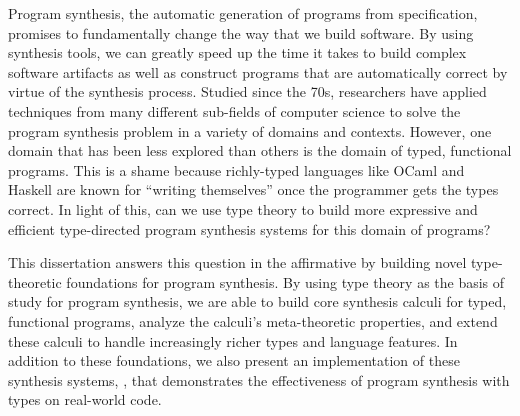 Program synthesis, the automatic generation of programs from specification, promises to fundamentally change the way that we build software.
By using synthesis tools, we can greatly speed up the time it takes to build complex software artifacts as well as construct programs that are automatically correct by virtue of the synthesis process.
Studied since the 70s, researchers have applied techniques from many different sub-fields of computer science to solve the program synthesis problem in a variety of domains and contexts.
However, one domain that has been less explored than others is the domain of typed, functional programs.
This is a shame because richly-typed languages like OCaml and Haskell are known for ``writing themselves'' once the programmer gets the types correct.
In light of this, can we use type theory to build more expressive and efficient type-directed program synthesis systems for this domain of programs?

This dissertation answers this question in the affirmative by building novel type-theoretic foundations for program synthesis.
By using type theory as the basis of study for program synthesis, we are able to build core synthesis calculi for typed, functional programs, analyze the calculi's meta-theoretic properties, and extend these calculi to handle increasingly richer types and language features.
In addition to these foundations, we also present an implementation of these synthesis systems, \myth{}, that demonstrates the effectiveness of program synthesis with types on real-world code.
